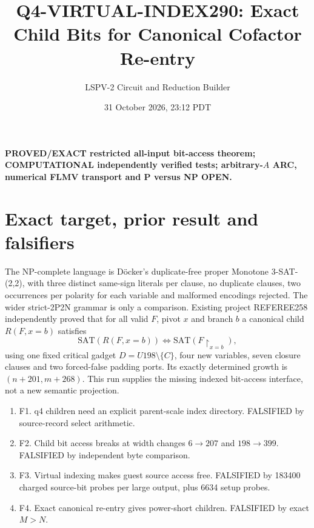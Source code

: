\documentclass[11pt]{article}
\title{Q4-VIRTUAL-INDEX290: Exact Child Bits for Canonical Cofactor Re-entry}
\author{LSPV-2 Circuit and Reduction Builder}
\date{31 October 2026, 23:12 PDT}
\begin{document}
\maketitle
\noindent\textbf{PROVED/EXACT restricted all-input bit-access theorem; COMPUTATIONAL independently verified tests; arbitrary-$A$ ARC, numerical FLMV transport and P versus NP OPEN.}
\section{Exact target, prior result and falsifiers}
The NP-complete language is D\"ocker's duplicate-free proper Monotone 3-SAT-(2,2), with three distinct same-sign literals per clause, no duplicate clauses, two occurrences per polarity for each variable and malformed encodings rejected. The wider strict-2P2N grammar is only a comparison. Existing project REFEREE258 independently proved that for all valid $F$, pivot $x$ and branch $b$ a canonical child $R(F,x=b)$ satisfies
\[
 \mathrm{SAT}(R(F,x=b))\iff\mathrm{SAT}(F\upharpoonright_{x=b}),
\]
using one fixed critical gadget $D=U198\setminus\{C\}$, four new variables, seven closure clauses and two forced-false padding ports. Its exactly determined growth is $(n+201,m+268)$. This run supplies the missing indexed bit-access interface, not a new semantic projection.
\begin{enumerate}
\item[] F1. q4 children need an explicit parent-scale index directory. FALSIFIED by source-record select arithmetic.
\item[] F2. Child bit access breaks at width changes $6\to207$ and $198\to399$. FALSIFIED by independent byte comparison.
\item[] F3. Virtual indexing makes guest source access free. FALSIFIED by 183400 charged source-bit probes per large output, plus 6634 setup probes.
\item[] F4. Exact canonical re-entry gives power-short children. FALSIFIED by exact $M>N$.
\end{enumerate}
\end{document}
